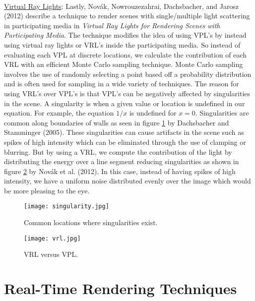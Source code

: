 \paragraph{}
\underline{Virtual Ray Lights}: Lastly, Nov\'{a}k, Nowrouzezahrai, Dachsbacher, and Jarosz (2012) describe a technique to render scenes with single/multiple light scattering in participating media in \textit{Virtual Ray Lights for Rendering Scenes with Participating Media}.  The technique modifies the idea of using VPL's by instead using virtual ray lights or VRL's inside the participating media.  So instead of evaluating each VPL at discrete locations, we calculate the contribution of each VRL with an efficient Monte Carlo sampling technique.  Monte Carlo sampling involves the use of randomly selecting a point based off a probability distribution and is often used for sampling in a wide variety of techniques.  The reason for using VRL's over VPL's is that VPL's can be negatively affected by singularities in the scene.  A singularity is when a given value or location is undefined in our equation.  For example, the equation $1/x$ is undefined for $x=0$.  Singularities are common along boundaries of walls as seen in figure \ref{fig:singularity} by Dachsbacher and Stamminger (2005).  These singularities can cause artifacts in the scene such as spikes of high intensity which can be eliminated through the use of clamping or blurring.  But by using a VRL, we compute the contribution of the light by distributing the energy over a line segment reducing singularities as shown in figure \ref{fig:vrl} by Nov\'{a}k et al. (2012).  In this case, instead of having spikes of high intensity, we have a uniform noise distributed evenly over the image which would be more pleasing to the eye.

\begin{figure}[h!]
  \centering
    \texttt{[image: singularity.jpg]}
  \caption{Common locations where singularities exist.}
	\label{fig:singularity}
\end{figure}

\begin{figure}[h!]
  \centering
    \texttt{[image: vrl.jpg]}
  \caption{VRL versus VPL.}
	\label{fig:vrl}
\end{figure}

\section{Real-Time Rendering Techniques} \label{sec:RT}
